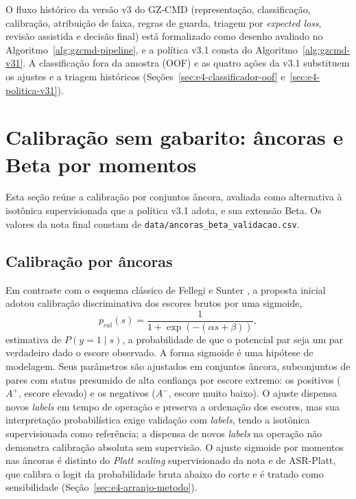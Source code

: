 O fluxo histórico da versão v3 do GZ-CMD (representação, classificação, calibração, atribuição de faixa, regras de guarda, triagem por \textit{expected loss}, revisão assistida e decisão final) está formalizado como desenho avaliado no Algoritmo~\ref{alg:gzcmd-pipeline}, e a política v3.1 consta do Algoritmo~\ref{alg:gzcmd-v31}. A classificação fora da amostra (OOF) e as quatro ações da v3.1 substituem os ajustes e a triagem históricos (Seções~\ref{sec:e4-classificador-oof} e~\ref{sec:e4-politica-v31}).

\section{Calibração sem gabarito: âncoras e Beta por momentos}\label{sec:e4-ap-ancoras}

Esta seção reúne a calibração por conjuntos âncora, avaliada como alternativa à isotônica supervisionada que a política v3.1 adota, e sua extensão Beta. Os valores da nota final constam de \texttt{data/ancoras\_beta\_validacao.csv}.

\subsection{Calibração por âncoras}
\label{sec:e4-calibracao}

Em contraste com o esquema clássico de Fellegi e Sunter \cite{Fellegi1969theory}, a proposta inicial adotou calibração discriminativa dos escores brutos por uma sigmoide,
\[
p_{cal}(s)=\frac{1}{1+\exp\left(-\left(\alpha s+\beta\right)\right)},
\]
estimativa de $P(y{=}1\mid s)$, a probabilidade de que o potencial par seja um par verdadeiro dado o escore observado. A forma sigmoide é uma hipótese de modelagem. Seus parâmetros são ajustados em conjuntos âncora, subconjuntos de pares com status presumido de alta confiança por escore extremo: os positivos ($A^+$, escore elevado) e os negativos ($A^-$, escore muito baixo). O ajuste dispensa novos \textit{labels} em tempo de operação e preserva a ordenação dos escores, mas sua interpretação probabilística exige validação com \textit{labels}, tendo a isotônica supervisionada como referência; a dispensa de novos \textit{labels} na operação não demonstra calibração absoluta sem supervisão. O ajuste sigmoide por momentos nas âncoras é distinto do \textit{Platt scaling} supervisionado da nota e de ASR-Platt, que calibra o logit da probabilidade bruta abaixo do corte e é tratado como sensibilidade (Seção~\ref{sec:e4-arranjo-metodo}).

